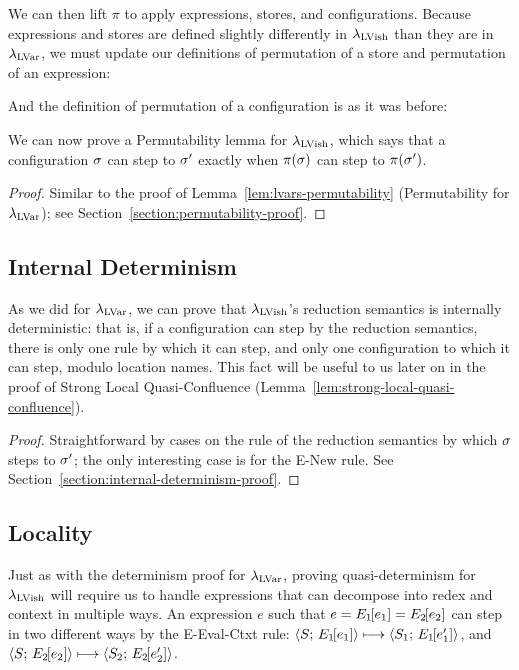 \DefPermutation

We can then lift $\pi$ to apply expressions, stores, and
configurations.  Because expressions and stores are defined slightly
differently in $\lambda_{\textrm{LVish}}$ than they are in $\lambda_{\textrm{LVar}}$, we must
update our definitions of permutation of a store and permutation of an
expression:

\DefPermutationExpression

\DefPermutationStore

And the definition of permutation of a configuration is as it was before:

\DefPermutationConfiguration

We can now prove a Permutability lemma for $\lambda_{\textrm{LVish}}$, which says
that a configuration $\sigma$ can step to $\sigma'$ exactly when
$\pi(\sigma)$ can step to $\pi(\sigma')$.

\LemPermutability
\begin{proof}
  Similar to the proof of Lemma~\ref{lem:lvars-permutability}
  (Permutability for $\lambda_{\textrm{LVar}}$); see
  Section~\ref{section:permutability-proof}.
\end{proof}

\subsection{Internal Determinism}

As we did for $\lambda_{\textrm{LVar}}$, we can prove that $\lambda_{\textrm{LVish}}$'s
reduction semantics is internally deterministic: that is, if a
configuration can step by the reduction semantics, there is only one
rule by which it can step, and only one configuration to which it can
step, modulo location names.  This fact will be useful to us later on
in the proof of Strong Local Quasi-Confluence
(Lemma~\ref{lem:strong-local-quasi-confluence}).

\LemInternalDeterminism
\begin{proof}
  Straightforward by cases on the rule of the reduction semantics by
  which $\sigma$ steps to $\sigma'$; the only interesting case is for
  the {\sc E-New} rule.  See
  Section~\ref{section:internal-determinism-proof}.
\end{proof}

\subsection{Locality}

Just as with the determinism proof for $\lambda_{\textrm{LVar}}$, proving
quasi-determinism for $\lambda_{\textrm{LVish}}$ will require us to handle
expressions that can decompose into redex and context in multiple
ways.  An expression $e$ such that $e = E_1\hspace{-1mm}\left[e_1\right] =
E_2\hspace{-1mm}\left[e_2\right]$ can step in two different ways by the {\sc
  E-Eval-Ctxt} rule: $\langle S;\, E_1\hspace{-1mm}\left[e_1\right] \rangle \longmapsto
\langle S_1;\, E_1\hspace{-1mm}\left[e'_1\right] \rangle$, and
$\langle S;\, E_2\hspace{-1mm}\left[e_2\right] \rangle \longmapsto
\langle S_2;\, E_2\hspace{-1mm}\left[e'_2\right] \rangle$.

